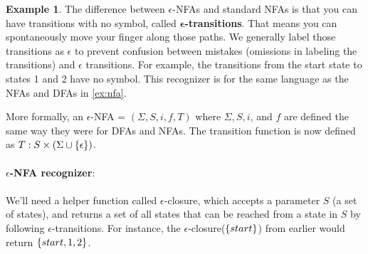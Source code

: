\documentclass[]{article}
\DeclarePairedDelimiter{\set}{\lbrace}{\rbrace}
\theoremstyle{definition}
\newtheorem{ex}{Example}[section]
\begin{document}
\begin{ex}
				The difference between $\epsilon$-NFAs and standard NFAs is that you can have transitions with no symbol, called $\boldsymbol{\epsilon}$\textbf{-transitions}. That means you can spontaneously move your finger along those paths. We generally label those transitions as $\epsilon$ to prevent confusion between mistakes (omissions in labeling the transitions) and $\epsilon$ transitions. For example, the transitions from the start state to states 1 and 2 have no symbol. This recognizer is for the same language as the NFAs and DFAs in \ref{ex:nfa}.
			\end{ex}

			More formally, an $\epsilon$-NFA = $(\Sigma, S, i, f, T)$ where $\Sigma, S, i$, and $f$ are defined the same way they were for DFAs and NFAs. The transition function is now defined as $T: S \times (\Sigma \cup \set{\epsilon} )$.
			\\ \\
			\textbf{$\epsilon$-NFA recognizer}:
			\\ \\
			We'll need a helper function called $\epsilon$-closure, which accepts a parameter $S$ (a set of states), and returns a set of all states that can be reached from a state in $S$ by following $\epsilon$-transitions. For instance, the $\epsilon$-closure($\set{start}$) from earlier would return $\set{start, 1, 2}$.
\end{document}
